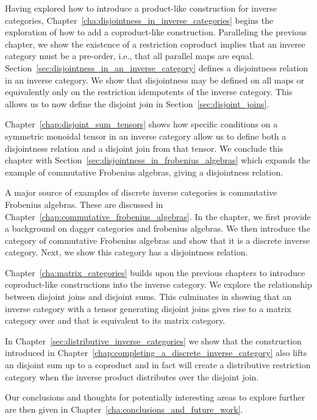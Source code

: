 Having explored how to introduce a product-like construction for inverse categories,
Chapter~\ref{cha:disjointness_in_inverse_categories} begins the exploration of how to add a
coproduct-like construction. Paralleling the previous chapter, we show the existence of a restriction
coproduct implies that an inverse category must be a pre-order, i.e., that all parallel maps are
equal. Section~\ref{sec:disjointness_in_an_inverse_category} defines a disjointness relation in an inverse category. We show
that disjointness may be defined on all maps or equivalently only on the restriction idempotents of
the inverse category. This allows us to now define the disjoint join in
Section~\ref{sec:disjoint_joins}.

Chapter~\ref{chap:disjoint_sum_tensors} shows how specific conditions on a symmetric monoidal
tensor in an inverse category allow us to define both a disjointness relation and a disjoint join
from that tensor. We conclude this chapter with Section~\ref{sec:disjointness_in_frobenius_algebras}
which expands the example of commutative Frobenius algebras, giving a disjointness relation.

A major source of examples of discrete inverse
categories is commutative Frobenius algebras. These are discussed in
Chapter~\ref{chap:commutative_frobenius_algebras}. In the chapter, we first provide
a background on dagger categories and frobenius algebras. We then introduce the category of
commutative Frobenius algebras and show that it is a discrete inverse category. Next, we show this
category has a disjointness relation.

Chapter~\ref{cha:matrix_categories} builds upon the previous chapters to introduce
coproduct-like constructions into the inverse
category. We explore the relationship between disjoint joins and
disjoint sums. This culminates in showing that an inverse category \X with a tensor generating disjoint
joins gives rise to a matrix category over \X and that \X is equivalent to its matrix
category.

In Chapter~\ref{sec:distributive_inverse_categories} we show that the
construction introduced in Chapter~\ref{chap:completing_a_discrete_inverse_category} also lifts an
disjoint sum up to a coproduct and in fact will create a distributive restriction category when the
inverse product distributes over the disjoint join.

Our conclusions and thoughts for potentially interesting areas to explore further are then given in
Chapter~\ref{cha:conclusions_and_future_work}.



